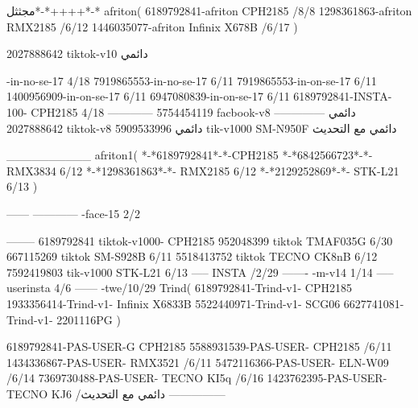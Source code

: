 مجثثل*-*++++*-*
afriton(
6189792841-afriton CPH2185  /8/8
1298361863-afriton RMX2185  /6/12
1446035077-afriton Infinix X678B  /6/17
)

2027888642 tiktok-v10
دائمي

-in-no-se-17 4/18
7919865553-in-no-se-17 6/11
7919865553-in-on-se-17 6/11
1400956909-in-on-se-17 6/11
6947080839-in-on-se-17 6/11
6189792841-INSTA-100- CPH2185 4/18
------------
5754454119 facbook-v8
دائمي
--------------
2027888642 tiktok-v8
دائمي
5909533996 tik-v1000  SM-N950F
دائمي مع التحديث

__________
afriton1(
*-*6189792841*-*-CPH2185
*-*6842566723*-*- RMX3834  6/12
*-*1298361863*-*- RMX2185  6/12
*-*2129252869*-*- STK-L21  6/13
)


------
------------
-face-15 2/2

--------
6189792841 tiktok-v1000- CPH2185 
952048399 tiktok TMAF035G  6/30
667115269 tiktok  SM-S928B  6/11
5518413752 tiktok  TECNO CK8nB  6/12
7592419803 tik-v1000 STK-L21  6/13
-----
 INSTA /2/29
-------
-m-v14 1/14
-----
userinsta 4/6
------
-twe/10/29
Trind(
6189792841-Trind-v1- CPH2185 
1933356414-Trind-v1-   Infinix X6833B \6
5522440971-Trind-v1- SCG06 \6
6627741081-Trind-v1- 2201116PG \6
)


6189792841-PAS-USER-G CPH2185 
5588931539-PAS-USER- CPH2185  /6/11
1434336867-PAS-USER- RMX3521  /6/11
5472116366-PAS-USER- ELN-W09  /6/14
7369730488-PAS-USER- TECNO KI5q  /6/16
1423762395-PAS-USER- TECNO KJ6  /دائمي مع التحديث
    ---------------
